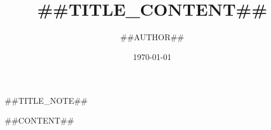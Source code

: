 \documentclass[10pt,landscape,twocolumn]{ctexart} %
\title{\Large\bfseries##TITLE_CONTENT##}			%
\author{##AUTHOR##}			%
\date{\today}
\begin{document}
	\onecolumn			%
	\maketitle			%
	\begin{center}
		##TITLE_NOTE##	%
	\end{center}

	\newpage
	\twocolumn			%
	\tableofcontents	%

	\newpage
	##CONTENT##			%
\end{document}
